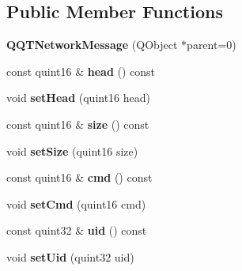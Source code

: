 \subsection*{Public Member Functions}
\begin{DoxyCompactItemize}
\item 
\mbox{\label{class_q_q_t_network_message_aa7317826eba7c3362d689052337171bf}} 
{\bfseries Q\+Q\+T\+Network\+Message} (Q\+Object $\ast$parent=0)
\item 
\mbox{\label{class_q_q_t_network_message_a16c62a869e43afa501e823b38f8ed478}} 
const quint16 \& {\bfseries head} () const
\item 
\mbox{\label{class_q_q_t_network_message_a79f24a019281ddbf04deb26df1573f5c}} 
void {\bfseries set\+Head} (quint16 head)
\item 
\mbox{\label{class_q_q_t_network_message_aeb5a474f80c4bbd956652c3dbe62f5a5}} 
const quint16 \& {\bfseries size} () const
\item 
\mbox{\label{class_q_q_t_network_message_ab1d4fb729a6dcbbf34541597f28be86d}} 
void {\bfseries set\+Size} (quint16 size)
\item 
\mbox{\label{class_q_q_t_network_message_adfadf5a57d73386f9c8292a8dc5fb7bf}} 
const quint16 \& {\bfseries cmd} () const
\item 
\mbox{\label{class_q_q_t_network_message_a579b9dac5db2ca0ff8c08d9377ad6a4f}} 
void {\bfseries set\+Cmd} (quint16 cmd)
\item 
\mbox{\label{class_q_q_t_network_message_a4e89acb7f9e28b5398333e2e5838fb8f}} 
const quint32 \& {\bfseries uid} () const
\item 
\mbox{\label{class_q_q_t_network_message_ae80406dd88b7d4e7b753909bee95eddb}} 
void {\bfseries set\+Uid} (quint32 uid)
\item 
\mbox{\label{class_q_q_t_network_message_acb8783a355503df66f7030aad6c07814}} 

\end{DoxyCompactItemize}
